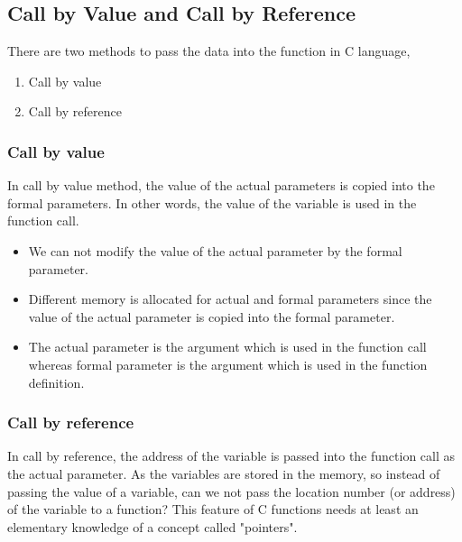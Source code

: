 \subsection{Call by Value and Call by Reference}
There are two methods to pass the data into the function in C language, 
\begin{enumerate}
    \item Call by value
    \item Call by reference
\end{enumerate}

\subsubsection{Call by value}
In call by value method, the value of the actual parameters is copied into the formal parameters. In other words, the value of the variable is used in the function call.

\begin{itemize}
    \item We can not modify the value of the actual parameter by the formal parameter.
    \item Different memory is allocated for actual and formal parameters since the value of the actual parameter is copied into the formal parameter.
    \item The actual parameter is the argument which is used in the function call whereas formal parameter is the argument which is used in the function definition.
\end{itemize}

\subsubsection{Call by reference}
In call by reference, the address of the variable is passed into the function call as the actual parameter. As the variables are stored in the memory, so instead of passing the value of a variable, can we not pass the location number (or address) of the variable to a function? This feature of C functions needs at least an elementary knowledge of a concept called "pointers".

\fi